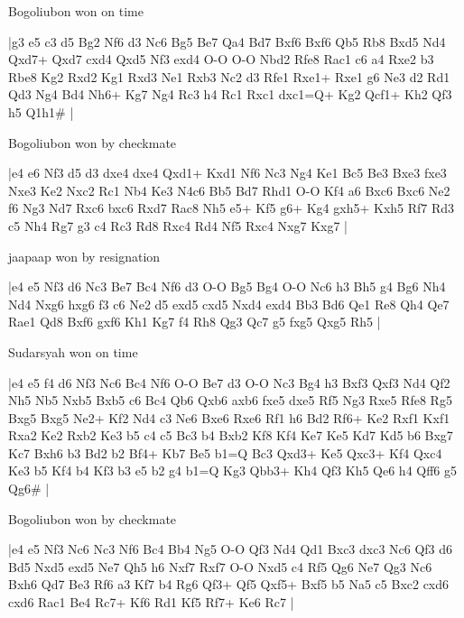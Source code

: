 \showboard

Bogoliubon won on time

\makegametitle
|g3 e5 c3 d5 Bg2 Nf6 d3 Nc6 Bg5 Be7 Qa4 Bd7 Bxf6 Bxf6 Qb5 Rb8 Bxd5 Nd4 Qxd7+ Qxd7 cxd4 Qxd5 Nf3 exd4 O-O O-O Nbd2 Rfe8 Rac1 c6 a4 Rxe2 b3 Rbe8 Kg2 Rxd2 Kg1 Rxd3 Ne1 Rxb3 Nc2 d3 Rfe1 Rxe1+ Rxe1 g6 Ne3 d2 Rd1 Qd3 Ng4 Bd4 Nh6+ Kg7 Ng4 Rc3 h4 Rc1 Rxc1 dxc1=Q+ Kg2 Qcf1+ Kh2 Qf3 h5 Q1h1\#  |

\showboard

Bogoliubon won by checkmate

\makegametitle
|e4 e6 Nf3 d5 d3 dxe4 dxe4 Qxd1+ Kxd1 Nf6 Nc3 Ng4 Ke1 Bc5 Be3 Bxe3 fxe3 Nxe3 Ke2 Nxc2 Rc1 Nb4 Ke3 N4c6 Bb5 Bd7 Rhd1 O-O Kf4 a6 Bxc6 Bxc6 Ne2 f6 Ng3 Nd7 Rxc6 bxc6 Rxd7 Rac8 Nh5 e5+ Kf5 g6+ Kg4 gxh5+ Kxh5 Rf7 Rd3 c5 Nh4 Rg7 g3 c4 Rc3 Rd8 Rxc4 Rd4 Nf5 Rxc4 Nxg7 Kxg7  |

\showboard

jaapaap won by resignation

\makegametitle
|e4 e5 Nf3 d6 Nc3 Be7 Bc4 Nf6 d3 O-O Bg5 Bg4 O-O Nc6 h3 Bh5 g4 Bg6 Nh4 Nd4 Nxg6 hxg6 f3 c6 Ne2 d5 exd5 cxd5 Nxd4 exd4 Bb3 Bd6 Qe1 Re8 Qh4 Qe7 Rae1 Qd8 Bxf6 gxf6 Kh1 Kg7 f4 Rh8 Qg3 Qc7 g5 fxg5 Qxg5 Rh5  |

\showboard

Sudarsyah won on time

\makegametitle
|e4 e5 f4 d6 Nf3 Nc6 Bc4 Nf6 O-O Be7 d3 O-O Nc3 Bg4 h3 Bxf3 Qxf3 Nd4 Qf2 Nh5 Nb5 Nxb5 Bxb5 c6 Bc4 Qb6 Qxb6 axb6 fxe5 dxe5 Rf5 Ng3 Rxe5 Rfe8 Rg5 Bxg5 Bxg5 Ne2+ Kf2 Nd4 c3 Ne6 Bxe6 Rxe6 Rf1 h6 Bd2 Rf6+ Ke2 Rxf1 Kxf1 Rxa2 Ke2 Rxb2 Ke3 b5 c4 c5 Bc3 b4 Bxb2 Kf8 Kf4 Ke7 Ke5 Kd7 Kd5 b6 Bxg7 Kc7 Bxh6 b3 Bd2 b2 Bf4+ Kb7 Be5 b1=Q Bc3 Qxd3+ Ke5 Qxc3+ Kf4 Qxc4 Ke3 b5 Kf4 b4 Kf3 b3 e5 b2 g4 b1=Q Kg3 Qbb3+ Kh4 Qf3 Kh5 Qe6 h4 Qff6 g5 Qg6\#  |

\showboard

Bogoliubon won by checkmate

\makegametitle
|e4 e5 Nf3 Nc6 Nc3 Nf6 Bc4 Bb4 Ng5 O-O Qf3 Nd4 Qd1 Bxc3 dxc3 Nc6 Qf3 d6 Bd5 Nxd5 exd5 Ne7 Qh5 h6 Nxf7 Rxf7 O-O Nxd5 c4 Rf5 Qg6 Ne7 Qg3 Nc6 Bxh6 Qd7 Be3 Rf6 a3 Kf7 b4 Rg6 Qf3+ Qf5 Qxf5+ Bxf5 b5 Na5 c5 Bxc2 cxd6 cxd6 Rac1 Be4 Rc7+ Kf6 Rd1 Kf5 Rf7+ Ke6 Rc7  |

